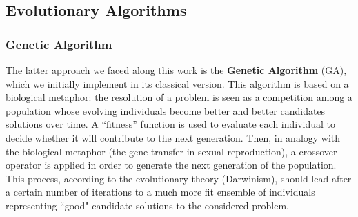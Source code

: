 \documentclass[10pt]{article}
\begin{document}
\subsection{Evolutionary Algorithms}
\subsubsection{Genetic Algorithm} \label{sec:gen_alg}
The latter approach we faced along this work is the \textbf{Genetic Algorithm} (GA), which we initially implement in its classical version.
This algorithm is based on a biological metaphor: the resolution of a problem is seen as a competition among a population whose evolving individuals become better and better candidates solutions over time. 
A “fitness” function is used to evaluate each individual to decide whether it will contribute to the next
generation. 
Then, in analogy with the biological metaphor (the gene transfer in sexual reproduction), a crossover operator is applied in order to generate the next generation of the population.
This process, according to the evolutionary theory (Darwinism), should lead after a certain number of iterations to a much more fit ensemble of individuals representing ``good" candidate solutions to the considered problem.

\end{document}
